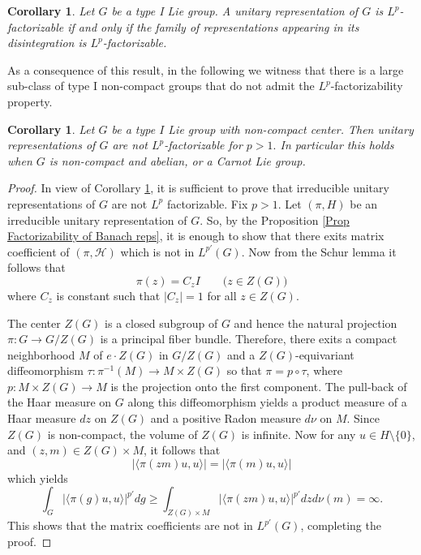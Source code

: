 \documentclass[12pt,letterpaper,titlepage,reqno]{amsart}
\theoremstyle{plain}
\newtheorem{cor}[theorem]{Corollary}
\theoremstyle{definition}
\numberwithin{equation}{section}
\newcommand{\cH}{\mathcal{H}}
\begin{document}
\begin{cor}
\label{typeI}
Let $G$ be a type I Lie group. A unitary representation of $G$ is $L^p$-factorizable if and only if  the family of representations appearing in its disintegration is $L^p$-factorizable.
\end{cor}

As a consequence of this result, in the following we witness that there is a large sub-class of type I non-compact groups that do not admit the $L^p$-factorizability property.

\begin{cor}
Let $G$ be a type $I$ Lie group with non-compact center. Then unitary representations of $G$ are not $L^p$-factorizable for $p>1.$ In particular this holds when $G$ is non-compact and abelian, or a Carnot Lie group.
\end{cor}



\begin{proof}
In view of  Corollary \ref{typeI}, it is sufficient to prove that irreducible unitary representations of $G$ are not $L^p$ factorizable. Fix $p>1.$ Let $(\pi, H)$ be an irreducible unitary representation of $G.$  So, by the Proposition \ref{Prop Factorizability of Banach reps}, it is enough to show that there exits matrix coefficient of $(\pi, \cH)$ which is not in $L^{p'}(G).$ Now from the Schur lemma it follows that
$$
\pi(z)
=C_z I\qquad \big(z\in Z(G)\big)
$$
where $C_z$ is constant such that $|C_z|=1$ for all $z\in Z(G).$

The center $Z(G)$ is a closed subgroup of $G$ and hence the natural projection $\pi:G\to G/Z(G)$ is a principal fiber bundle. Therefore, there exits a compact neighborhood $M$ of  $e\cdot Z(G)$ in $G/Z(G)$ and a $Z(G)$-equivariant diffeomorphism $\tau:\pi^{-1}(M)\to M\times Z(G)$ so that $\pi=p\circ \tau$, where $p:M\times Z(G)\to M$ is the projection onto the first component. The pull-back of the Haar measure on $G$ along this diffeomorphism yields a product measure of a Haar measure $dz$ on $Z(G)$ and a positive Radon measure $d\nu$ on $M$. Since $Z(G)$ is non-compact, the volume of $Z(G)$ is infinite. Now for any $u\in H\setminus\{0\}$, and $(z,m)\in Z(G)\times M$, it follows that $$|\langle \pi(zm)u,u\rangle|=|\langle \pi(m)u,u\rangle|$$ which yields
$$
\int_{G}|\langle \pi(g)u,u\rangle|^{p'}dg
\geq \int_{Z(G)\times M}|\langle \pi(zm)u,u\rangle|^{p'}dzd\nu(m)=\infty.
$$
This shows  that the matrix coefficients are not in $L^{p'}(G)$, completing the proof.
\end{proof}
\end{document}
